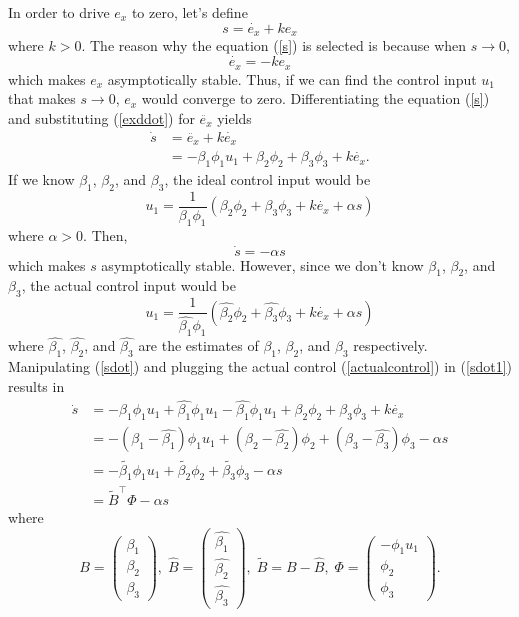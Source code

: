 In order to drive $e_x$ to zero, let's define
\begin{equation}
s=\dot{e_x}+ke_x
\label{s}
\end{equation} where $k>0$. The reason why the equation (\ref{s}) is selected is because when $s\rightarrow0$, 
\begin{equation}
\dot{e_x}=-ke_x
\end{equation} which makes $e_x$ asymptotically stable. Thus, if we can find the control input $u_1$ that makes $s\rightarrow0$, $e_x$ would converge to zero. Differentiating the equation (\ref{s}) and substituting (\ref{exddot}) for $\ddot{e_x}$ yields
\begin{align}
\dot{s}&=\ddot{e_x}+k\dot{e_x}
\\&=-\beta_1\phi_1u_1+\beta_2\phi_2+\beta_3\phi_3+k\dot{e_x}.
\label{sdot}
\end{align}
If we know $\beta_1$, $\beta_2$, and $\beta_3$, the ideal control input would be 
\begin{equation}
u_1=\frac{1}{\beta_1\phi_1}(\beta_2\phi_2+\beta_3\phi_3+k\dot{e_x}+\alpha s)
\end{equation}
where $\alpha>0$.
Then, 
\begin{equation}
\dot{s}=-\alpha s
\end{equation} 
which makes $s$ asymptotically stable. 
However, since we don't know $\beta_1$, $\beta_2$, and $\beta_3$, the actual control input would be 
\begin{equation}
u_1=\frac{1}{\hat{\beta_1}\phi_1}(\hat{\beta_2}\phi_2+\hat{\beta_3}\phi_3+k\dot{e_x}+\alpha s)
\label{actualcontrol}
\end{equation}
where $\hat{\beta_1}$, $\hat{\beta_2}$, and $\hat{\beta_3}$ are the estimates of $\beta_1$, $\beta_2$, and $\beta_3$ respectively. Manipulating (\ref{sdot}) and plugging the actual control (\ref{actualcontrol}) in (\ref{sdot1}) results in
\begin{align}
\dot{s}&=-\beta_1\phi_1u_1+\hat{\beta_1}\phi_1u_1-\hat{\beta_1}\phi_1u_1+\beta_2\phi_2+\beta_3\phi_3+k\dot{e_x}
\label{sdot1}
\\&=-(\beta_1-\hat{\beta_1})\phi_1u_1+(\beta_2-\hat{\beta_2})\phi_2+(\beta_3-\hat{\beta_3})\phi_3-\alpha s
\\&=-\tilde{\beta_1}\phi_1u_1+\tilde{\beta_2}\phi_2+\tilde{\beta_3}\phi_3-\alpha s
\\&=\tilde{B}^\top\Phi-\alpha s
\label{sdot2}
\end{align}
where 
\begin{equation}
B=\begin{pmatrix}
\beta_1 \\ \beta_2 \\ \beta_3
\end{pmatrix}, \;
\hat{B}=\begin{pmatrix} \hat{\beta_1} \\ \hat{\beta_2} \\ \hat{\beta_3} \end{pmatrix}, \;
\tilde{B}=B-\hat{B}, \; 
\Phi=\begin{pmatrix} -\phi_1u_1 \\ \phi_2 \\ \phi_3 \end{pmatrix}.
\end{equation}
